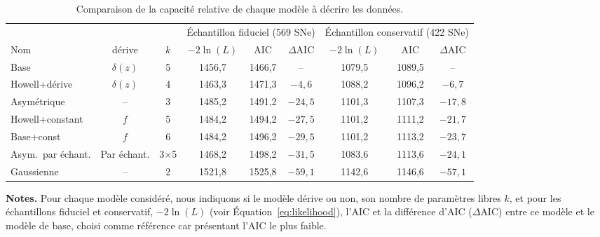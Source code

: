 \documentclass[../main/main.tex]{subfiles}
\begin{document}
\begin{table}[ht]
    \centerfloat
    \begin{threeparttable}
    \caption[Comparaison de la capacité relative de chaque modèle à décrire les
    données par rapport au modèle de base]{Comparaison de la capacité relative
    de chaque modèle à décrire les données.} \label{tab:comp}
        \begin{tabular}{lcccccccc}
            \toprule
            & & & \multicolumn{3}{c}{Échantillon fiduciel (569 SNe)}
                & \multicolumn{3}{c}{Échantillon conservatif (422 SNe)} \\
            \cmidrule(lr){4-6} \cmidrule(lr){7-9}
            Nom & dérive & $k$ &
            $-2\ln(L)$ & AIC & $\Delta$AIC & $-2\ln(L)$ & AIC & $\Delta$AIC\\
            \midrule
            Base & $\delta(z)$ & 5
            & 1456,7 & 1466,7 & -- 
            & 1079,5 & 1089,5 & -- \\
            Howell+dérive & $\delta(z)$ & 4
            & 1463,3 & 1471,3 & $-4,6$
            & 1088,2 & 1096,2 & $-6,7$ 
            \\
            Asymétrique & -- & 3
            & 1485,2 & 1491,2 & $-24,5$
            & 1101,3 & 1107,3 & $-17,8$ 
            \\
            Howell+constant & $f$ & 5
            & 1484,2 & 1494,2 & $-27,5$
            & 1101,2 & 1111,2 & $-21,7$ 
            \\
            Base+const & $f$ & 6
            & 1484,2 & 1496,2 & $-29,5$
            & 1101,2 & 1113,2 & $-23,7$ 
            \\
            Asym.\ par échant. & Par échant. & 3$\times$5
            & 1468,2 & 1498,2  & $-31,5$
            & 1083,6 & 1113,6  & $-24,1$ 
            \\
            Gaussienne & -- & 2
            & 1521,8 & 1525,8 & $-59,1$
            & 1142,6 & 1146,6 & $-57,1$ 
            \\
            \bottomrule
        \end{tabular}%
        \begin{tablenotes}[flushleft]
        \item\small \textbf{\hspace{-3.2pt}Notes.} Pour chaque modèle considéré,
            nous indiquons si le modèle dérive ou non, son nombre de paramètres
            libres $k$, et pour les échantillons fiduciel et conservatif,
            $-2\ln(L)$ (voir Équation~\ref{eq:likelihood}), l'AIC et la
            différence d'AIC ($\Delta$AIC) entre ce modèle et le modèle de base,
            choisi comme référence car présentant l'AIC le plus faible.
        \end{tablenotes}
    \end{threeparttable}
\end{table}
\end{document}
